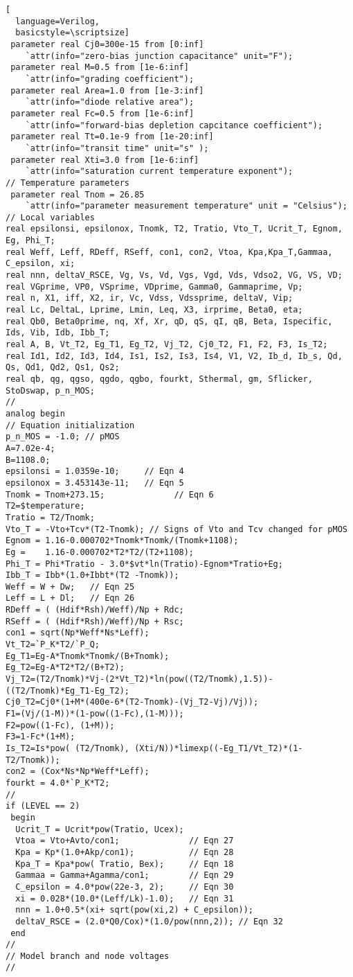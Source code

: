 \begin{lstlisting}[
  language=Verilog,
  basicstyle=\scriptsize]
 parameter real Cj0=300e-15 from [0:inf] 
	`attr(info="zero-bias junction capacitance" unit="F");
 parameter real M=0.5 from [1e-6:inf] 
	`attr(info="grading coefficient");
 parameter real Area=1.0 from [1e-3:inf] 
	`attr(info="diode relative area");
 parameter real Fc=0.5 from [1e-6:inf] 
	`attr(info="forward-bias depletion capcitance coefficient");
 parameter real Tt=0.1e-9 from [1e-20:inf] 
	`attr(info="transit time" unit="s" );
 parameter real Xti=3.0 from [1e-6:inf] 
	`attr(info="saturation current temperature exponent");
// Temperature parameters
 parameter real Tnom = 26.85      
	`attr(info="parameter measurement temperature" unit = "Celsius");
// Local variables
real epsilonsi, epsilonox, Tnomk, T2, Tratio, Vto_T, Ucrit_T, Egnom, Eg, Phi_T;
real Weff, Leff, RDeff, RSeff, con1, con2, Vtoa, Kpa,Kpa_T,Gammaa, C_epsilon, xi;
real nnn, deltaV_RSCE, Vg, Vs, Vd, Vgs, Vgd, Vds, Vdso2, VG, VS, VD;
real VGprime, VP0, VSprime, VDprime, Gamma0, Gammaprime, Vp;
real n, X1, iff, X2, ir, Vc, Vdss, Vdssprime, deltaV, Vip;
real Lc, DeltaL, Lprime, Lmin, Leq, X3, irprime, Beta0, eta;
real Qb0, Beta0prime, nq, Xf, Xr, qD, qS, qI, qB, Beta, Ispecific, Ids, Vib, Idb, Ibb_T;
real A, B, Vt_T2, Eg_T1, Eg_T2, Vj_T2, Cj0_T2, F1, F2, F3, Is_T2;
real Id1, Id2, Id3, Id4, Is1, Is2, Is3, Is4, V1, V2, Ib_d, Ib_s, Qd, Qs, Qd1, Qd2, Qs1, Qs2;
real qb, qg, qgso, qgdo, qgbo, fourkt, Sthermal, gm, Sflicker, StoDswap, p_n_MOS;
//
analog begin
// Equation initialization
p_n_MOS = -1.0; // pMOS
A=7.02e-4;
B=1108.0;
epsilonsi = 1.0359e-10;     // Eqn 4
epsilonox = 3.453143e-11;   // Eqn 5
Tnomk = Tnom+273.15;              // Eqn 6
T2=$temperature;
Tratio = T2/Tnomk;
Vto_T = -Vto+Tcv*(T2-Tnomk); // Signs of Vto and Tcv changed for pMOS
Egnom = 1.16-0.000702*Tnomk*Tnomk/(Tnomk+1108);
Eg =    1.16-0.000702*T2*T2/(T2+1108);
Phi_T = Phi*Tratio - 3.0*$vt*ln(Tratio)-Egnom*Tratio+Eg;
Ibb_T = Ibb*(1.0+Ibbt*(T2 -Tnomk));
Weff = W + Dw;   // Eqn 25
Leff = L + Dl;   // Eqn 26
RDeff = ( (Hdif*Rsh)/Weff)/Np + Rdc;
RSeff = ( (Hdif*Rsh)/Weff)/Np + Rsc;
con1 = sqrt(Np*Weff*Ns*Leff);
Vt_T2=`P_K*T2/`P_Q;
Eg_T1=Eg-A*Tnomk*Tnomk/(B+Tnomk);
Eg_T2=Eg-A*T2*T2/(B+T2);
Vj_T2=(T2/Tnomk)*Vj-(2*Vt_T2)*ln(pow((T2/Tnomk),1.5))-((T2/Tnomk)*Eg_T1-Eg_T2);
Cj0_T2=Cj0*(1+M*(400e-6*(T2-Tnomk)-(Vj_T2-Vj)/Vj));
F1=(Vj/(1-M))*(1-pow((1-Fc),(1-M)));
F2=pow((1-Fc), (1+M));
F3=1-Fc*(1+M);
Is_T2=Is*pow( (T2/Tnomk), (Xti/N))*limexp((-Eg_T1/Vt_T2)*(1-T2/Tnomk));
con2 = (Cox*Ns*Np*Weff*Leff);
fourkt = 4.0*`P_K*T2;
//
if (LEVEL == 2)
 begin
  Ucrit_T = Ucrit*pow(Tratio, Ucex);
  Vtoa = Vto+Avto/con1;              // Eqn 27
  Kpa = Kp*(1.0+Akp/con1);           // Eqn 28
  Kpa_T = Kpa*pow( Tratio, Bex);     // Eqn 18
  Gammaa = Gamma+Agamma/con1;        // Eqn 29
  C_epsilon = 4.0*pow(22e-3, 2);     // Eqn 30
  xi = 0.028*(10.0*(Leff/Lk)-1.0);   // Eqn 31
  nnn = 1.0+0.5*(xi+ sqrt(pow(xi,2) + C_epsilon));
  deltaV_RSCE = (2.0*Q0/Cox)*(1.0/pow(nnn,2)); // Eqn 32
 end
//
// Model branch and node voltages
//


\end{lstlisting}

